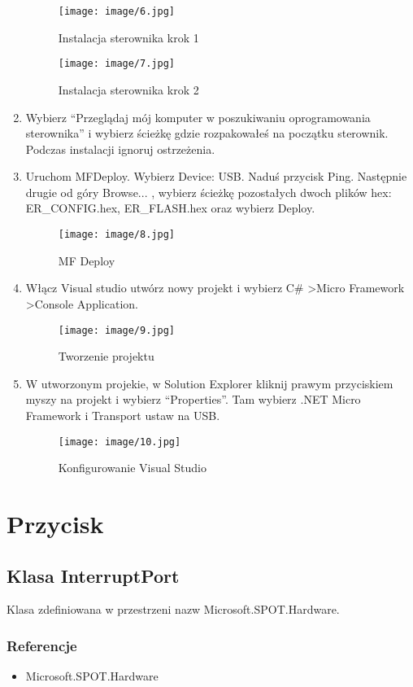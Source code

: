 \documentclass{article}
\begin{document}
\begin{enumerate}
\begin{figure}[H]
\texttt{[image: image/6.jpg]}
\caption{Instalacja sterownika krok 1}
\end{figure}
\begin{figure}[H]
\texttt{[image: image/7.jpg]}
\caption{Instalacja sterownika krok 2}
\end{figure}

\item Wybierz “Przeglądaj mój komputer w poszukiwaniu oprogramowania sterownika” i wybierz ścieżkę gdzie rozpakowałeś na początku sterownik. Podczas instalacji ignoruj ostrzeżenia.
\item Uruchom MFDeploy. Wybierz Device: USB. Naduś przycisk Ping. Następnie drugie od góry Browse... , wybierz ścieżkę pozostałych dwoch plików hex: ER\_CONFIG.hex, ER\_FLASH.hex oraz wybierz Deploy.

\begin{figure}[H]
\texttt{[image: image/8.jpg]}
\caption{MF Deploy}
\end{figure}
\item Włącz Visual studio utwórz nowy projekt i wybierz C\# \textgreater Micro Framework \textgreater Console Application.

\begin{figure}[H]
\texttt{[image: image/9.jpg]}
\caption{Tworzenie projektu}
\end{figure}
\item W utworzonym projekie, w Solution Explorer kliknij prawym przyciskiem myszy na projekt i wybierz “Properties”. Tam wybierz .NET Micro Framework i Transport ustaw na USB.

\begin{figure}[H]
\texttt{[image: image/10.jpg]}
\caption{Konfigurowanie Visual Studio}
\end{figure}
\end{enumerate}

\section{Przycisk}
\subsection{Klasa InterruptPort}
Klasa zdefiniowana w przestrzeni nazw Microsoft.SPOT.Hardware.
\subsubsection{Referencje}
\begin{itemize}
\item Microsoft.SPOT.Hardware
\end{itemize}
\end{document}
